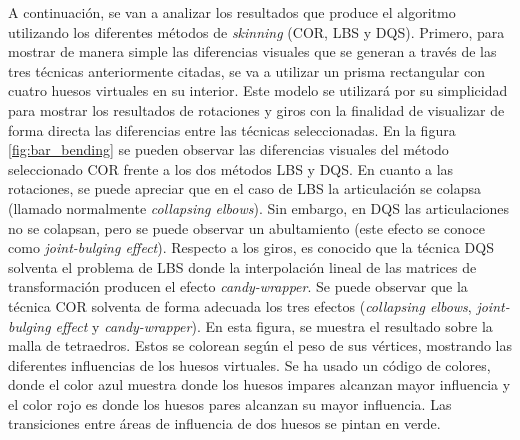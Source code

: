 




A continuación, se van a analizar los resultados que produce el algoritmo utilizando los diferentes métodos de \emph{skinning} (\ac{COR}, \ac{LBS} y \ac{DQS}).
%
Primero, para mostrar de manera simple las diferencias visuales que se generan a través de las tres técnicas anteriormente citadas, se va a utilizar un prisma rectangular con cuatro huesos virtuales en su interior. Este modelo  se utilizará por su simplicidad para mostrar los resultados de rotaciones y giros con la finalidad de visualizar de forma directa las diferencias entre las técnicas seleccionadas. En la figura \ref{fig:bar_bending} se pueden observar las diferencias visuales del método seleccionado \ac{COR} frente a los dos métodos \ac{LBS} y \ac{DQS}. En cuanto a las rotaciones, se puede apreciar que en el caso de \ac{LBS} la articulación se colapsa (llamado normalmente \emph{collapsing elbows}). Sin embargo, en \ac{DQS} las articulaciones no se colapsan, pero se puede observar un abultamiento (este efecto se conoce como \emph{joint-bulging effect}). Respecto a los giros, es conocido que la técnica \ac{DQS} solventa el problema de \ac{LBS} donde la interpolación lineal de las matrices de transformación producen el efecto \emph{candy-wrapper}. Se puede observar que la técnica \ac{COR} solventa de forma adecuada los tres efectos (\emph{collapsing elbows}, \emph{joint-bulging effect} y \emph{candy-wrapper}). 
En esta figura, se muestra el resultado sobre la malla de tetraedros. Estos se colorean según el peso de sus vértices, mostrando las diferentes influencias de los huesos virtuales. Se ha usado un código de colores, donde el color azul muestra donde los huesos impares alcanzan mayor influencia y el color rojo es donde los huesos pares alcanzan su mayor influencia. %
Las transiciones entre áreas de influencia de dos huesos se pintan en verde.

